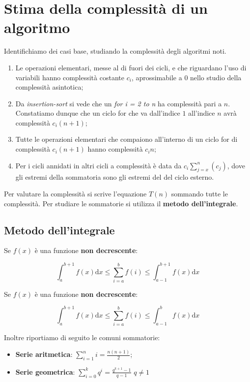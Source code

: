 \section{Stima della complessità di un algoritmo}

Identifichiamo dei casi base, studiando la complessità degli algoritmi noti.

\begin{enumerate}

\item Le operazioni elementari, messe al di fuori dei cicli, e che riguardano l'uso di variabili hanno complessità costante $c_i$, aprossimabile a 0 nello studio della complessità asintotica;

\item Da \textit{insertion-sort} si vede che un \textit{for i = 2 to n} ha complessità pari a $n$. Constatiamo dunque che un ciclo for che va dall'indice $1$ all'indice $n$ avrà complessità $c_i(n+1)$;

\item Tutte le operazioni elementari che compaiono all'interno di un ciclo for di complessità $c_i(n+1)$ hanno complessità $c_in$;

\item Per i cicli annidati in altri cicli a complessità è data da $c_i\sum_{j=x}^{n}(c_j)$, dove gli estremi della sommatoria sono gli estremi del del ciclo esterno.

\end{enumerate}

Per valutare la complessità si scrive l'equazione $T(n)$ sommando tutte le complessità. Per studiare le sommatorie si utilizza il \textbf{metodo dell'integrale}.

\subsection{Metodo dell'integrale}

Se $f(x)$ è una funzione \textbf{non decrescente}:

$$\int_a^{b+1} f(x)\mathrm{d}x\le \sum_{i=a}^b f(i) \le \int_{a-1}^{b+1} f(x)\mathrm{d}x$$

Se $f(x)$ è una funzione \textbf{non decrescente}:

$$\int_a^{b+1} f(x)\mathrm{d}x \le \sum_{i=a}^b f(i) \le \int_{a-1}^b f(x)\mathrm{d}x$$

Inoltre riportiamo di seguito le comuni sommatorie:

\begin{itemize}

\item \textbf{Serie aritmetica}: $\sum_{i=1}^n i = \frac{n(n+1)}{2}$;
\item \textbf{Serie geometrica}: $\sum_{i=0}^k q^i = \frac{q^{k+1}-1}{q-1}$ \hfill $q\neq1$

\end{itemize}

